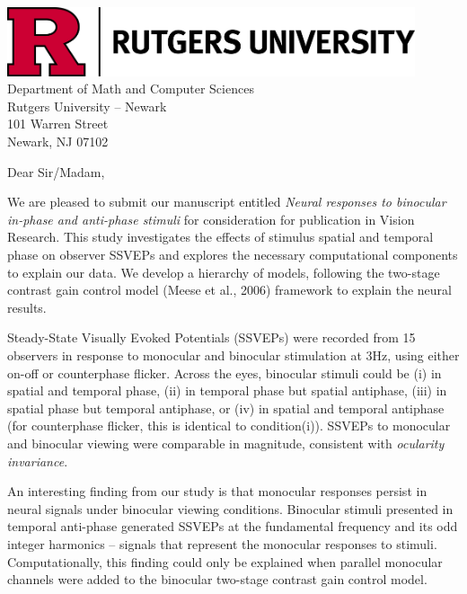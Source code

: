\documentclass[12pt]{article}
\begin{document}
\noindent
\begin{minipage}[t]{0.6\textwidth}
\end{minipage}%
\hfill
\begin{minipage}[t]{0.5\textwidth}
    \raggedleft
    \includegraphics[width=0.9\textwidth]{Figures/RU_H_1LINE_RED_BLACK_RGB.png}\\[1em] %
    {\small
    Department of Math and Computer Sciences\\
    Rutgers University – Newark\\
    101 Warren Street\\
    Newark, NJ 07102
    }
\end{minipage}

\vspace{2cm} %

Dear Sir/Madam,

We are pleased to submit our manuscript entitled \textit{Neural responses to binocular in-phase and anti-phase stimuli} for consideration for publication in Vision Research. This study investigates the effects of stimulus spatial and temporal phase on observer SSVEPs and explores the necessary computational components to explain our data. We develop a hierarchy of models, following the two-stage contrast gain control model (Meese et al., 2006) framework to explain the neural results.

Steady-State Visually Evoked Potentials (SSVEPs) were recorded from 15 observers in response to monocular and binocular stimulation at 3Hz, using either on-off or counterphase flicker. Across the eyes, binocular stimuli could be (i) in spatial and temporal phase, (ii) in temporal phase but spatial antiphase, (iii) in spatial phase but temporal antiphase, or (iv) in spatial and temporal antiphase (for counterphase flicker, this is identical to condition(i)). SSVEPs to monocular and binocular viewing were comparable in magnitude, consistent with \textit{ocularity invariance}. 

An interesting finding from our study is that monocular responses persist in neural signals under binocular viewing conditions. Binocular stimuli presented in temporal anti-phase generated SSVEPs at the fundamental frequency and its odd integer harmonics -- signals that represent the monocular responses to stimuli. Computationally, this finding could only be explained when parallel monocular channels were added to the binocular two-stage contrast gain control model.
\end{document}
